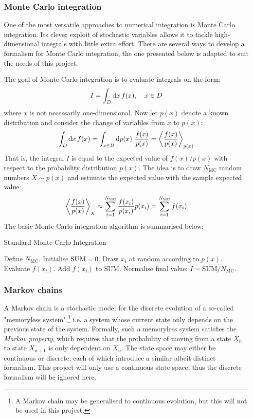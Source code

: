 \documentclass[nofootinbib,reprint,english]{revtex4-1}
\begin{document}
\subsubsection{Monte Carlo integration}
One of the most versatile approaches to numerical integration is Monte Carlo integration. Its clever exploit of stochastic variables allows it to tackle high-dimensional integrals with little extra effort. There are several ways to develop a formalism for Monte Carlo integration, the one presented below is adapted to suit the needs of this project.

The goal of Monte Carlo integration is to evaluate integrals on the form:
\begin{equation}\label{eq:general_integral}
I=\int_D\dd{x}f(x)\qc x\in D
\end{equation}
where \(x\) is not necessarily one-dimensional. Now let \(p(x)\) denote a known distribution and consider the change of variables from \(x\) to \(p(x)\):
\begin{equation}\label{eq:integral_to_expected_value}
\int_D\dd{x}f(x)=\int_{x\in D}\dd{p(x)}\,\frac{f(x)}{p(x)}=\expval{\frac{f(x)}{p(x)}}_{p(x)}
\end{equation}
That is, the integral \(I\) is equal to the expected value of \(f(x)/p(x)\) with respect to the probability distribution \(p(x)\). The idea is to draw \(N_\text{MC}\) random numbers \(X\sim p(x)\) and estimate the expected value with the sample expected value:
\begin{equation}\label{eq:approximated_expected_value}
\expval{\frac{f(x)}{p(x)}}_X\approx\sum_{i=1}^{N_\text{MC}}\frac{f(x_i)}{p(x_i)}p(x_i)=\sum_{i=1}^{N_\text{MC}}f(x_i)
\end{equation}
The basic Monte Carlo integration algorithm is summarised below:
\begin{algorithm}[H]
\caption{Standard Monte Carlo Integration}\label{algo:standard_Monte_Carlo}
\begin{algorithmic}[1]
\State Define \(N_\text{MC}\).
\State Initialise \(\text{SUM}=0\).
	\State Draw \(x_i\) at random according to \(p(x)\).
	\State Evaluate \(f(x_i)\).
	\State Add \(f(x_i)\) to SUM.
\EndFor
\State Normalise final value: \(I=\text{SUM}/N_\text{MC}\).
\end{algorithmic}
\end{algorithm}
\newpage
\subsubsection{Markov chains}
A Markov chain is a stochastic model for the discrete evolution of a so-called "memoryless system",\footnote{A Markov chain may be generalised to continuous evolution, but this will not be used in this project.} i.e. a system whose current state only depends on the previous state of the system. Formally, such a memoryless system satisfies the \emph{Markov property}, which requires that the probability of moving from a state \(X_n\) to state \(X_{n+1}\) is only dependent on \(X_n\). The state space may either be continuous or discrete, each of which introduce a similar albeit distinct formalism. This project will only use a continuous state space, thus the discrete formalism will be ignored here.
\end{document}
